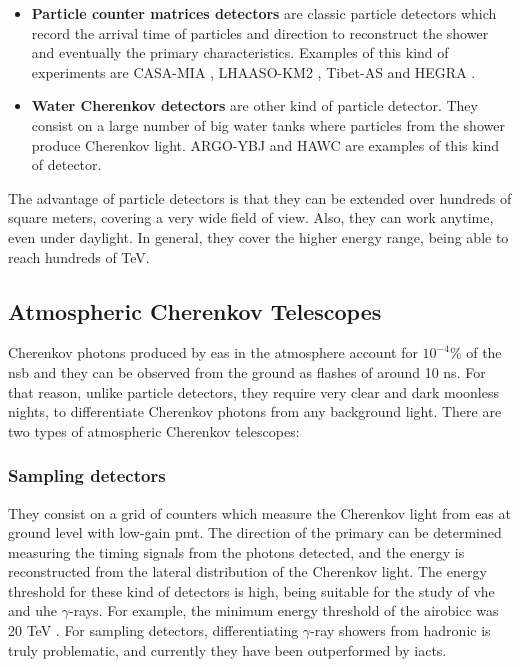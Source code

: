 \documentclass[main.tex]{subfiles}
\begin{document}
\begin{itemize}
    \item \textbf{Particle counter matrices detectors} are classic particle detectors which record the arrival time of particles and direction to reconstruct the shower and eventually the primary characteristics. Examples of this kind of experiments are CASA-MIA \cite{casamia}, LHAASO-KM2 \cite{2016LHAASO}, Tibet-AS \cite{1990TibetAs} and HEGRA \cite{FONSECA1992HEGRA}.\\
    \item \textbf{Water Cherenkov detectors} are other kind of particle detector. They consist on a large number of big water tanks where particles from the shower produce Cherenkov light. ARGO-YBJ \cite{2015Argo} and HAWC \cite{2014HAWC} are examples of this kind of detector.\\

\end{itemize}
The advantage of particle detectors is that they can be extended over hundreds of square meters, covering a very wide field of view. Also, they can work anytime, even under daylight. In general, they cover the higher energy range, being able to reach hundreds of TeV.

\subsection{Atmospheric Cherenkov Telescopes}

Cherenkov photons produced by \gls{eas} in the atmosphere account for $10^{-4}$\% of the \gls{nsb} and they can be observed from the ground as flashes of around 10 ns. For that reason, unlike particle detectors, they require very clear and dark moonless nights, to differentiate Cherenkov photons from any background light. There are two types of atmospheric Cherenkov telescopes:  

\subsubsection{Sampling detectors}

They consist on a grid of counters which measure the Cherenkov light from \gls{eas} at ground level with low-gain \gls{pmt}. The direction of the primary can be determined measuring the timing signals from the photons detected, and the energy is reconstructed from the lateral distribution of the Cherenkov light. The energy threshold for these kind of detectors is high, being suitable for the study of \gls{vhe} and \gls{uhe} $\gamma$-rays. For example, the minimum energy threshold of the \gls{airobicc} was 20 TeV \cite{1996AIROBICC}. For sampling detectors, differentiating $\gamma$-ray showers from hadronic is truly problematic, and currently they have been outperformed by \glspl{iact}. 
\end{document}
